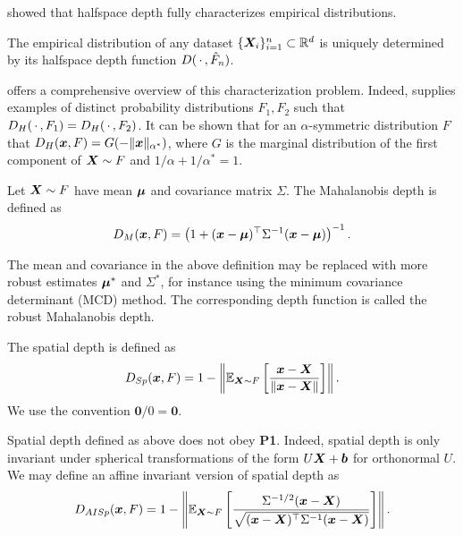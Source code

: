 \textcite{struyf-rousseeuw-1999} showed that halfspace depth fully
characterizes empirical distributions.

\begin{theorem}
    The empirical distribution of any dataset $\{\bm{X}_i\}_{i = 1}^n \subset
    \mathbb{R}^d$ is uniquely determined by its halfspace depth function $D(\,\cdot\,,
    \hat{F}_n)$.
\end{theorem}

\textcite{nagy-2020} offers a comprehensive overview of this characterization
problem.
Indeed, \textcite{nagy-2021} supplies examples of distinct probability
distributions $F_1, F_2$ such that $D_H(\,\cdot\,, F_1) = D_H(\,\cdot\,, F_2)$.
It can be shown that for an $\alpha$-symmetric distribution $F$ that $D_H(\bm{x},
F) = G(-\Vert \bm{x} \Vert_{\alpha^*})$, where $G$ is the marginal distribution of the
first component of $\bm{X} \sim F$ and $1/\alpha + 1/\alpha^* = 1$.



\begin{definition}
    Let $\bm{X} \sim F$ have mean $\bm{\mu}$ and covariance matrix $\Sigma$.
    The Mahalanobis depth is defined as
    \begin{equation}
        D_{M}(\bm{x}, F) = \left(1 + (\bm{x} - \bm{\mu})^\top \Sigma^{-1}(\bm{x} - \bm{\mu})\right)^{-1}.
    \end{equation}
\end{definition}

\begin{remark}
    The mean and covariance in the above definition may be replaced with more
    robust estimates $\bm{\mu}^*$ and $\Sigma^*$, for instance using the minimum
    covariance determinant (MCD) method.
    The corresponding depth function is called the robust Mahalanobis depth.
\end{remark}

\begin{definition}
    The spatial depth is defined as
    \begin{equation}
        D_{Sp}(\bm{x}, F) = 1 - \left\Vert \operatorname{\mathbb{E}}_{\bm{X} \sim F}\left[\frac{\bm{x} - \bm{X}}{\Vert \bm{x} - \bm{X} \Vert}\right] \right\Vert.
    \end{equation}
    We use the convention $\bm0/0 = \bm0$.
\end{definition}

\begin{remark}
    Spatial depth defined as above does not obey \textbf{P1}.
    Indeed, spatial depth is only invariant under spherical transformations of
    the form $U\bm{X} + \bm{b}$ for orthonormal $U$.
    We may define an affine invariant version of spatial depth as
    \begin{equation}
        D_{AISp}(\bm{x}, F) = 1 - \left\Vert \operatorname{\mathbb{E}}_{\bm{X} \sim F}\left[\frac{\Sigma^{-1/2}(\bm{x} - \bm{X})}{\sqrt{(\bm{x} - \bm{X})^\top\Sigma^{-1}(\bm{x} - \bm{X})}}\right] \right\Vert.
    \end{equation}
\end{remark}

